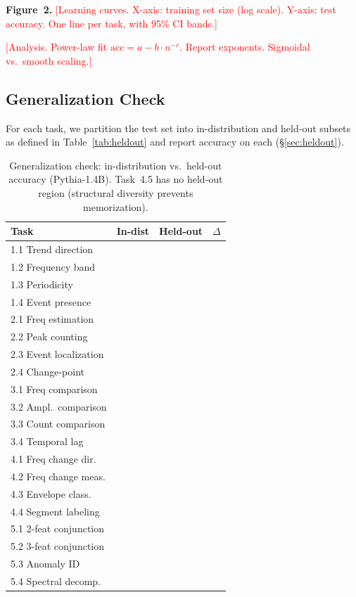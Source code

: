 \documentclass[11pt]{article}
\newcommand{\placeholder}[1]{\textcolor{red}{[#1]}}
\begin{document}
\textbf{Figure~2.} \placeholder{Learning curves. X-axis: training set size (log scale). Y-axis: test accuracy. One line per task, with 95\% CI bands.}

\placeholder{Analysis. Power-law fit $\mathrm{acc} = a - b\cdot n^{-c}$. Report exponents. Sigmoidal vs.\ smooth scaling.}


\subsection{Generalization Check}
\label{sec:generalization}

For each task, we partition the test set into in-distribution and held-out subsets as defined in Table~\ref{tab:heldout} and report accuracy on each (\S\ref{sec:heldout}).

\begin{table}[t]
\centering
\small
\caption{Generalization check: in-distribution vs.\ held-out accuracy (Pythia-1.4B). Task~4.5 has no held-out region (structural diversity prevents memorization).}
\label{tab:generalization}
\begin{tabular}{lccc}
\toprule
\textbf{Task} & \textbf{In-dist} & \textbf{Held-out} & \textbf{$\Delta$} \\
\midrule
1.1 Trend direction      &  &  &  \\
1.2 Frequency band       &  &  &  \\
1.3 Periodicity          &  &  &  \\
1.4 Event presence       &  &  &  \\
\midrule
2.1 Freq estimation      &  &  &  \\
2.2 Peak counting        &  &  &  \\
2.3 Event localization   &  &  &  \\
2.4 Change-point         &  &  &  \\
\midrule
3.1 Freq comparison      &  &  &  \\
3.2 Ampl.\ comparison    &  &  &  \\
3.3 Count comparison     &  &  &  \\
3.4 Temporal lag         &  &  &  \\
\midrule
4.1 Freq change dir.     &  &  &  \\
4.2 Freq change meas.    &  &  &  \\
4.3 Envelope class.      &  &  &  \\
4.4 Segment labeling     &  &  &  \\
\midrule
5.1 2-feat conjunction   &  &  &  \\
5.2 3-feat conjunction   &  &  &  \\
5.3 Anomaly ID           &  &  &  \\
5.4 Spectral decomp.     &  &  &  \\
\bottomrule
\end{tabular}
\end{table}
\end{document}
